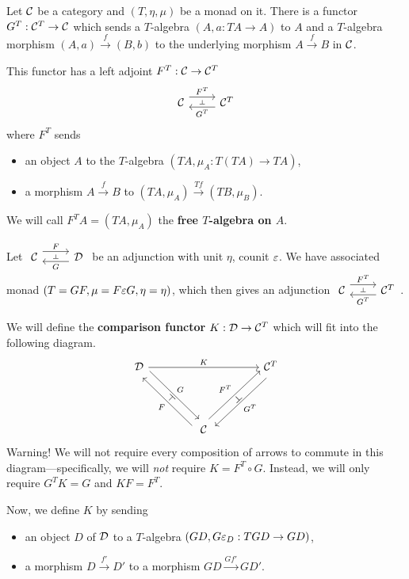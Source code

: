 \documentclass[12pt]{article}
\begin{document}
\newpage
\begin{prop}
    Let $\mathcal{C}$ be a category and $(T,\eta,\mu)$ be a monad on it. There is a functor $G^T: \mathcal{C}^T \to \mathcal{C}$ which sends a $T$-algebra $(A,a:TA\to A)$ to $A$ and a $T$-algebra morphism $(A,a)\xrightarrow{f} (B,b)$ to the underlying morphism $A\xrightarrow{f} B$ in $\mathcal{C}$.
    
    This functor has a left adjoint $F^T: \mathcal{C} \to \mathcal{C}^T$
    \[\adjunction{\cC}{\cC^T}{F^T}{G^T}\]
    where $F^T$ sends
    \begin{itemize}
        \item an object $A$ to the $T$-algebra $(TA,\mu_A: T(TA) \to TA)$,
        \item a morphism $A\xrightarrow{f} B$ to $(TA,\mu_A) \xrightarrow{Tf} (TB,\mu_B)$.
    \end{itemize}
    We will call $F^T A = (TA,\mu_A)$ the \textbf{free $T$-algebra on $A$}.
\end{prop}

\begin{construction}
    Let $\adjunction{\cC}{\cD}{F}{G}$ be an adjunction with unit $\eta$, counit $\varepsilon$. We have associated monad $(T=GF,\mu=F\varepsilon G, \eta=\eta)$, which then gives an adjunction $\adjunction{\cC}{\cC^T}{F^T}{G^T}$.

    We will define the \textbf{comparison functor} $K: \mathcal{D} \to \mathcal{C}^T$ which will fit into the following diagram.
    \[\begin{tikzcd}[column sep=1.5cm, row sep=1.5cm]
        \cD \ar[rr,"K"] \ar[dr, shift left=1ex, "G",""{name=G}] & & \cC^T \ar[dl,shift left=1ex, "G^T",""{name=GT}]\\
        & \cC \ar[ul,shift left=1ex, "F",""{name=F}]\ar[ur, shift left=1ex, "F^T",""{name=FT}] & \ar[from=F, to=G,phantom,"\dashv"{sloped, allow upside down, auto=false}] \ar[from=FT, to=GT,phantom,"\dashv"{sloped, allow upside down, auto=false}]
    \end{tikzcd}\]
    Warning! We will not require every composition of arrows to commute in this diagram---specifically, we will \textit{not} require $K = F^T \circ G$. Instead, we will only require $G^T K = G$ and $K F = F^T$.
    
    Now, we define $K$ by sending
    \begin{itemize}
        \item an object $D$ of $\mathcal{D}$ to a $T$-algebra $(GD,G\varepsilon_D: TGD \to GD)$,
        \item a morphism $D\xrightarrow{f'} D'$ to a morphism $GD \xrightarrow{G f'} GD'$.
    \end{itemize}
\end{construction}
\end{document}
